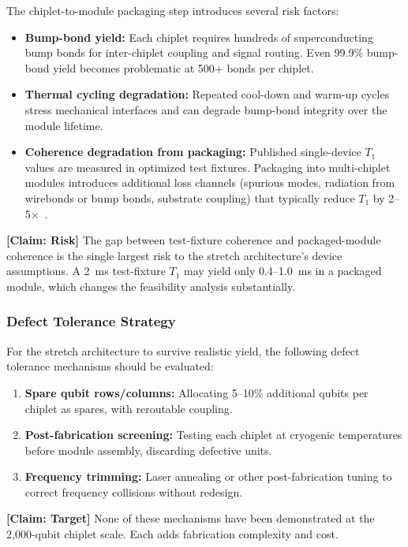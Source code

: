 \documentclass[conference]{IEEEtran}
\begin{document}
The chiplet-to-module packaging step introduces several risk factors:

\begin{itemize}
\item \textbf{Bump-bond yield:} Each chiplet requires hundreds of superconducting bump bonds for inter-chiplet coupling and signal routing. Even 99.9\% bump-bond yield becomes problematic at 500+ bonds per chiplet.
\item \textbf{Thermal cycling degradation:} Repeated cool-down and warm-up cycles stress mechanical interfaces and can degrade bump-bond integrity over the module lifetime.
\item \textbf{Coherence degradation from packaging:} Published single-device $T_1$ values are measured in optimized test fixtures. Packaging into multi-chiplet modules introduces additional loss channels (spurious modes, radiation from wirebonds or bump bonds, substrate coupling) that typically reduce $T_1$ by 2--5$\times$~\cite{kjaergaard2020}.
\end{itemize}

\textbf{[Claim: Risk]} The gap between test-fixture coherence and packaged-module coherence is the single largest risk to the stretch architecture's device assumptions. A 2~ms test-fixture $T_1$ may yield only 0.4--1.0~ms in a packaged module, which changes the feasibility analysis substantially.

\subsubsection{Defect Tolerance Strategy}

For the stretch architecture to survive realistic yield, the following defect tolerance mechanisms should be evaluated:

\begin{enumerate}
\item \textbf{Spare qubit rows/columns:} Allocating 5--10\% additional qubits per chiplet as spares, with reroutable coupling.
\item \textbf{Post-fabrication screening:} Testing each chiplet at cryogenic temperatures before module assembly, discarding defective units.
\item \textbf{Frequency trimming:} Laser annealing or other post-fabrication tuning to correct frequency collisions without redesign.
\end{enumerate}

\textbf{[Claim: Target]} None of these mechanisms have been demonstrated at the 2,000-qubit chiplet scale. Each adds fabrication complexity and cost.
\end{document}
